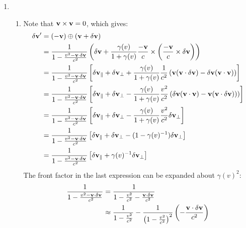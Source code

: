 \documentclass[12pt,a4]{article}
\begin{document}
\begin{enumerate}
\begin{enumerate}
    \end{enumerate}
  \item
    \begin{enumerate}
      \item
        Note that ${\bf v} \times {\bf v} = 0$, which gives:
        \begin{align*}
          \delta {\bf v}' &= (-{\bf v}) \oplus ({\bf v + \delta v})\\
                          &= \frac{1}{1 - \frac{ v^2 - {\bf v}\cdot \delta {\bf v}}{c^2}} \left( \delta {\bf v} + \frac{\gamma(v)}{1 + \gamma(v)} \frac{- {\bf v}}{c} \times \left(\frac{- {\bf v}}{c} \times \delta {\bf v}\right)\right)\\
                          &= \frac{1}{1 - \frac{ v^2 - {\bf v}\cdot \delta {\bf v}}{c^2}}\left[ \delta {\bf v}_\parallel + \delta {\bf v}_\perp + \frac{\gamma(v)}{1 + \gamma(v)}\frac{1}{c^2} \left({\bf v}({\bf v} \cdot \delta {\bf v}) - \delta {\bf v}({\bf v} \cdot {\bf v})\right)\right]\\
                          &= \frac{1}{1 - \frac{ v^2 - {\bf v}\cdot \delta {\bf v}}{c^2}}\left[ \delta {\bf v}_\parallel + \delta {\bf v}_\perp - \frac{\gamma(v)}{1 + \gamma(v)}\frac{v^2}{c^2} \left(\delta {\bf v}({\bf v} \cdot {\bf v}) - {\bf v}({\bf v} \cdot \delta {\bf v}) )\right)\right]\\
                          &= \frac{1}{1 - \frac{ v^2 - {\bf v}\cdot \delta {\bf v}}{c^2}}\left[ \delta {\bf v}_\parallel + \delta {\bf v}_\perp - \frac{\gamma(v)}{1 + \gamma(v)}\frac{v^2}{c^2} \delta {\bf v}_\perp\right]\\
                          &= \frac{1}{1 - \frac{ v^2 - {\bf v}\cdot \delta {\bf v}}{c^2}}\left[ \delta {\bf v}_\parallel + \delta {\bf v}_\perp - (1 - \gamma(v)^{-1}) \delta {\bf v}_\perp\right]\\
                          &= \frac{1}{1 - \frac{ v^2 - {\bf v}\cdot \delta {\bf v}}{c^2}}\left[ \delta {\bf v}_\parallel +  \gamma(v)^{-1} \delta {\bf v}_\perp\right]\\
        \end{align*}
        The front factor in the last expression can be expanded about $\gamma(v)^2$:
        \begin{align*}
          \frac{1}{1 - \frac{ v^2 - {\bf v}\cdot \delta {\bf v}}{c^2}} &= \frac{1}{1 - \frac{ v^2 }{c^2} - \frac{{\bf v}\cdot \delta {\bf v}}{c^2}}\\
                                                                       &\approx \frac{1}{1 - \frac{ v^2 }{c^2} } - \frac{1}{\left(1 - \frac{ v^2 }{c^2}\right)^2 }\left(- \frac{{\bf v}\cdot \delta {\bf v}}{c^2}\right)\\

\end{align*}
\end{enumerate}
\end{enumerate}
\end{document}
